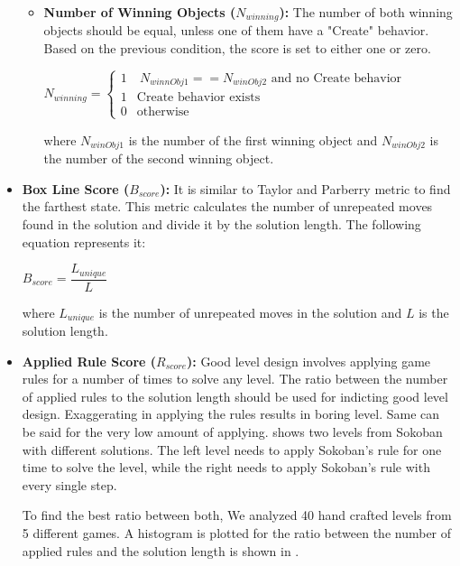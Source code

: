 \begin{itemize}
\begin{itemize}
		\item \textbf{Number of Winning Objects ($N_{winning}$):} The number of both winning objects should be equal, unless one of them have a "Create" behavior. Based on the previous condition, the score is set to either one or zero.
		\begin{center}
			$N_{winning}= \begin{cases}
			               1 & \ N_{winnObj1} == N_{winObj2} \text{ and no Create behavior}\\
			               1 & \text{Create behavior exists}\\
			               0 & \text{otherwise}
			           \end{cases}$
		\end{center}
		where $N_{winObj1}$ is the number of the first winning object and $N_{winObj2}$ is the number of the second winning object.
	\end{itemize}
	
	\item \textbf{Box Line Score ($B_{score}$):} It is similar to Taylor and Parberry\cite{sokobanLevelGenerationNew} metric to find the farthest state. This metric calculates the number of unrepeated moves found in the solution and divide it by the solution length. The following equation represents it:
	\begin{center}$B_{score} = \dfrac{L_{unique}}{L}$\end{center}
	where $L_{unique}$ is the number of unrepeated moves in the solution and $L$ is the solution length.
	
	\item \textbf{Applied Rule Score ($R_{score}$):} Good level design involves applying game rules for a number of times to solve any level. The ratio between the number of applied rules to the solution length should be used for indicting good level design. Exaggerating in applying the rules results in boring level. Same can be said for the very low amount of applying.  shows two levels from Sokoban with different solutions. The left level needs to apply Sokoban's rule for one time to solve the level, while the right needs to apply Sokoban's rule with every single step.
	
	
	To find the best ratio between both, We analyzed 40 hand crafted levels from 5 different games. A histogram is plotted for the ratio between the number of applied rules and the solution length is shown in .
	

\end{itemize}

